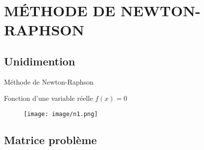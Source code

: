 \documentclass[11pt]{beamer}
\begin{document}




\section{MÉTHODE DE NEWTON-RAPHSON}
\subsection{Unidimention}


\begin{frame}{Méthode de Newton-Raphson}
\begin{block}{Fonction d'une variable réelle}
$f(x) = 0$
 \end{block}
 
\begin{figure}
\texttt{[image: image/n1.png]}
\end{figure}



 
 
\end{frame}



\subsection{Matrice problème}

\end{document}
